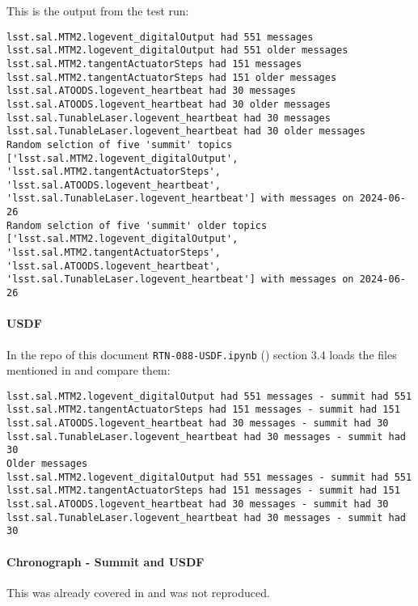 This is the output from the test run:

\begin{lstlisting}
lsst.sal.MTM2.logevent_digitalOutput had 551 messages
lsst.sal.MTM2.logevent_digitalOutput had 551 older messages
lsst.sal.MTM2.tangentActuatorSteps had 151 messages
lsst.sal.MTM2.tangentActuatorSteps had 151 older messages
lsst.sal.ATOODS.logevent_heartbeat had 30 messages
lsst.sal.ATOODS.logevent_heartbeat had 30 older messages
lsst.sal.TunableLaser.logevent_heartbeat had 30 messages
lsst.sal.TunableLaser.logevent_heartbeat had 30 older messages
Random selction of five 'summit' topics ['lsst.sal.MTM2.logevent_digitalOutput', 'lsst.sal.MTM2.tangentActuatorSteps', 'lsst.sal.ATOODS.logevent_heartbeat', 'lsst.sal.TunableLaser.logevent_heartbeat'] with messages on 2024-06-26
Random selction of five 'summit' older topics ['lsst.sal.MTM2.logevent_digitalOutput', 'lsst.sal.MTM2.tangentActuatorSteps', 'lsst.sal.ATOODS.logevent_heartbeat', 'lsst.sal.TunableLaser.logevent_heartbeat'] with messages on 2024-06-26
\end{lstlisting}

\paragraph{USDF}
In the repo of this document \texttt{RTN-088-USDF.ipynb} ()  section 3.4
loads the files mentioned in  and compare them:

\begin{lstlisting}
lsst.sal.MTM2.logevent_digitalOutput had 551 messages - summit had 551
lsst.sal.MTM2.tangentActuatorSteps had 151 messages - summit had 151
lsst.sal.ATOODS.logevent_heartbeat had 30 messages - summit had 30
lsst.sal.TunableLaser.logevent_heartbeat had 30 messages - summit had 30
Older messages
lsst.sal.MTM2.logevent_digitalOutput had 551 messages - summit had 551
lsst.sal.MTM2.tangentActuatorSteps had 151 messages - summit had 151
lsst.sal.ATOODS.logevent_heartbeat had 30 messages - summit had 30
lsst.sal.TunableLaser.logevent_heartbeat had 30 messages - summit had 30
\end{lstlisting}

\paragraph{Chronograph - Summit and USDF} \label{sec:chrono}
This was already covered in \cite{RTN-053} and was not reproduced.

